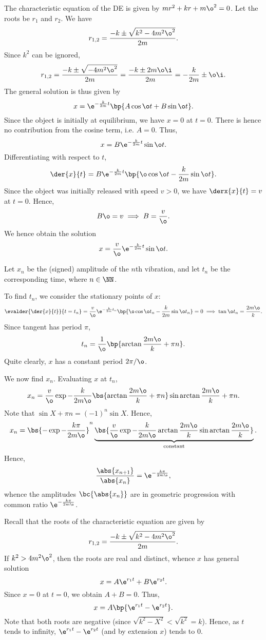 \begin{solution}
    \begin{ppart}
        The characteristic equation of the DE is given by $m r^2 + kr + m \o^2 = 0$. Let the roots be $r_1$ and $r_2$. We have \[r_{1, 2} = \frac{-k \pm \sqrt{k^2 - 4m^2 \o^2}}{2m}.\] Since $k^2$ can be ignored, \[r_{1, 2} = \frac{-k \pm \sqrt{-4m^2 \o^2}}{2m} = \frac{-k \pm 2m \o \i}{2m} = -\frac{k}{2m} \pm \o \i.\] The general solution is thus given by \[x = \e^{-\frac{k}{2m} t} \bp{A \cos \o t + B \sin \o t}.\] Since the object is initially at equilibrium, we have $x = 0$ at $t = 0$. There is hence no contribution from the cosine term, i.e. $A = 0$. Thus, \[x = B \e^{-\frac{k}{2m} t} \sin \o t.\] Differentiating with respect to $t$, \[\der{x}{t} = B \e^{-\frac{k}{2m} t} \bp{\o \cos \o t - \frac{k}{2m} \sin \o t}.\] Since the object was initially released with speed $v > 0$, we have $\derx{x}{t} = v$ at $t = 0$. Hence, \[B \o = v \implies B = \frac{v}{\o}.\] We hence obtain the solution \[x = \frac{v}{\o} \e^{-\frac{k}{2m} t} \sin \o t.\]
    \end{ppart}
    \begin{ppart}
        Let $x_n$ be the (signed) amplitude of the $n$th vibration, and let $t_n$ be the corresponding time, where $n \in \NN$.

        To find $t_n$, we consider the stationary points of $x$: \[\evalder{\der{x}{t}}{t = t_n} = \frac{v}{\o} \e^{-\frac{k}{2m} t_n} \bp{\o \cos \o t_n - \frac{k}{2m} \sin \o t_n} = 0 \implies \tan \o t_n = \frac{2m\o}{k}.\] Since tangent has period $\pi$, \[t_n = \frac{1}{\o} \bp{\arctan \frac{2m\o}{k} + \pi n}.\] Quite clearly, $x$ has a constant period $2\pi / \o$.
        
        We now find $x_n$. Evaluating $x$ at $t_n$, \[x_n = \frac{v}{\o} \exp{-\frac{k}{2m \o} \bs{\arctan \frac{2m\o}{k} + \pi n}} \sin{\arctan \frac{2m\o}{k} + \pi n}.\] Note that $\sin{X + \pi n} = (-1)^n \sin X$. Hence, \[x_n = \bs{-\exp{-\frac{k\pi}{2m \o}}}^n \underbrace{\bs{\frac{v}{\o} \exp{-\frac{k}{2m \o} \arctan \frac{2m\o}{k}} \sin{\arctan \frac{2m\o}{k}}}}_{\text{constant}}.\] Hence, \[\frac{\abs{x_{n+1}}}{\abs{x_n}} = \e^{-\frac{k\pi}{2m \o}},\] whence the amplitudes $\bc{\abs{x_n}}$ are in geometric progression with common ratio $\e^{-\frac{k\pi}{2m \o}}$.
    \end{ppart}
    \begin{ppart}
        Recall that the roots of the characteristic equation are given by \[r_{1, 2} = \frac{-k \pm \sqrt{k^2 - 4m^2 \o^2}}{2m}.\] If $k^2 > 4m^2 \o^2$, then the roots are real and distinct, whence $x$ has general solution \[x = A\e^{r_1 t} + B\e^{r_2 t}.\] Since $x = 0$ at $t = 0$, we obtain $A + B = 0$. Thus, \[x = A\bp{\e^{r_1 t} - \e^{r_2 t}}.\] Note that both roots are negative (since $\sqrt{k^2 - X^2} < \sqrt{k^2} = k$). Hence, as $t$ tends to infinity, $\e^{r_1 t} - \e^{r_2 t}$ (and by extension $x$) tends to 0.


\end{ppart}
\end{solution}
